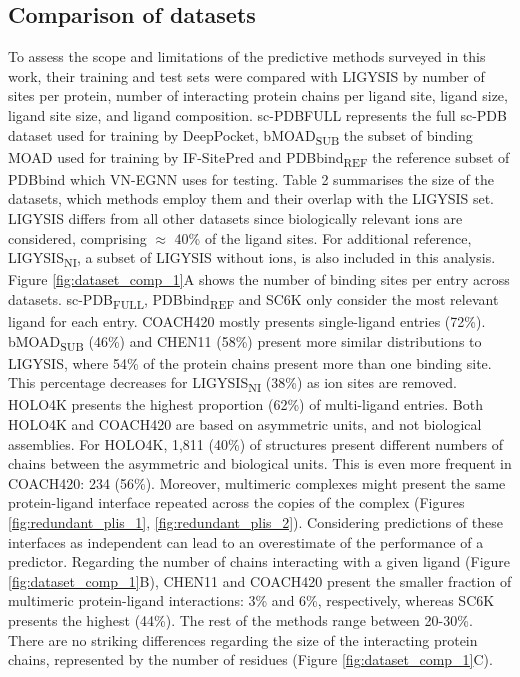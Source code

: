 \subsection{Comparison of datasets}

To assess the scope and limitations of the predictive methods surveyed in this work, their training and test sets were compared with LIGYSIS by number of sites per protein, number of interacting protein chains per ligand site, ligand size, ligand site size, and ligand composition. sc-PDBFULL represents the full sc-PDB dataset used for training by DeepPocket, bMOAD\textsubscript{SUB} the subset of binding MOAD used for training by IF-SitePred and PDBbind\textsubscript{REF} the reference subset of PDBbind which VN-EGNN uses for testing. Table 2 summarises the size of the datasets, which methods employ them and their overlap with the LIGYSIS set. LIGYSIS differs from all other datasets since biologically relevant ions are considered, comprising $\approx$ 40\% of the ligand sites. For additional reference, LIGYSIS\textsubscript{NI}, a subset of LIGYSIS without ions, is also included in this analysis. Figure \ref{fig:dataset_comp_1}A shows the number of binding sites per entry across datasets. sc-PDB\textsubscript{FULL}, PDBbind\textsubscript{REF} and SC6K only consider the most relevant ligand for each entry. COACH420 mostly presents single-ligand entries (72\%). bMOAD\textsubscript{SUB} (46\%) and CHEN11 (58\%) present more similar distributions to LIGYSIS, where 54\% of the protein chains present more than one binding site. This percentage decreases for LIGYSIS\textsubscript{NI} (38\%) as ion sites are removed. HOLO4K presents the highest proportion (62\%) of multi-ligand entries. Both HOLO4K and COACH420 are based on asymmetric units, and not biological assemblies. For HOLO4K, 1,811 (40\%) of structures present different numbers of chains between the asymmetric and biological units. This is even more frequent in COACH420: 234 (56\%). Moreover, multimeric complexes might present the same protein-ligand interface repeated across the copies of the complex (Figures \ref{fig:redundant_plis_1}, \ref{fig:redundant_plis_2}). Considering predictions of these interfaces as independent can lead to an overestimate of the performance of a predictor. Regarding the number of chains interacting with a given ligand (Figure \ref{fig:dataset_comp_1}B), CHEN11 and COACH420 present the smaller fraction of multimeric protein-ligand interactions: 3\% and 6\%, respectively, whereas SC6K presents the highest (44\%). The rest of the methods range between 20-30\%. There are no striking differences regarding the size of the interacting protein chains, represented by the number of residues (Figure \ref{fig:dataset_comp_1}C).

